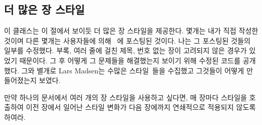 \subsection{더 많은 장 스타일}

이 클래스는 이 절에서 보이듯 더 많은 장 스타일을 제공한다.
몇개는 내가 직접 작성한 것이며 다른 몇개는  사용자들에
의해 \ctt\ 에 포스팅된 것이다.
나는 그 포스팅된 것들의 일부를 수정했다.
부록, 여러 줄에 걸친 제목, 번호 없는 장이 고려되지 않은 경우가 있었기 때문이다.
그 후 어떻게 그 문제들을 해결했는지 보이기 위해 수정된 코드를 공개했다. 
그와 별개로 Lars Madsen는 
수많은 스타일~\cite{CHAPSTYLES}들을 수집했고 그것들이 어떻게 만들어졌는지 보였다.


만약 하나의 문서에서 여러 개의 장 스타일을 사용하고 싶다면,
매 장마다  스타일을 호출하여 이전 장에서 일어난 스타일 변화가
다음 장에까지 연쇄적으로 적용되지 않도록 하여라.



\newcommand\PScaveat[1]{
  \smallskip\noindent
  \textbf{Caveat:} The \Pcstyle{#1} style requires the
\Lpack{graphicx} package.
\smallskip
}


